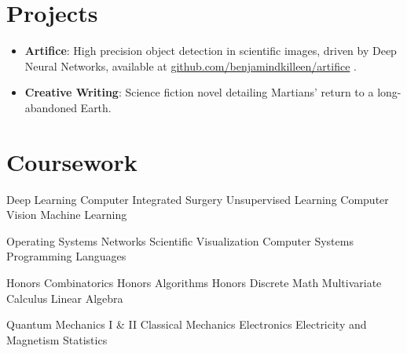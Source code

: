 \documentclass[letterpaper,11pt]{article}
\newcommand{\delim}{\hspace{.1em}\textbullet\hspace{.25em}}
\newcommand{\resumeItem}[2]{
  \item\small{
    \textbf{#1}{: #2 \vspace{-2pt}}
  }
}
\newcommand{\resumeSubItem}[2]{\resumeItem{#1}{#2}\vspace{-4pt}}
\newcommand{\resumeSubHeadingListStart}{\begin{itemize}[leftmargin=*]}
\newcommand{\resumeSubHeadingListEnd}{\end{itemize}}
\begin{document}
\section{Projects}
\resumeSubHeadingListStart

\resumeSubItem{Artifice}{High precision object detection in scientific images,
  driven by Deep Neural Networks, available at
  \href{https://github.com/benjamindkilleen/artifice}{github.com/benjamindkilleen/artifice}}.

\resumeSubItem{Creative Writing}{Science fiction novel detailing Martians'
  return to a long-abandoned Earth.}

\resumeSubHeadingListEnd

\section{Coursework}

Deep Learning \delim Computer Integrated Surgery \delim
Unsupervised Learning \delim Computer Vision \delim
Machine Learning

Operating Systems \delim Networks \delim Scientific Visualization
\delim Computer Systems \delim Programming Languages

Honors Combinatorics \delim Honors Algorithms \delim Honors Discrete Math
\delim Multivariate Calculus \delim Linear Algebra

Quantum Mechanics I \& II \delim Classical Mechanics \delim Electronics
\delim Electricity and Magnetism \delim Statistics



  
\end{document}
